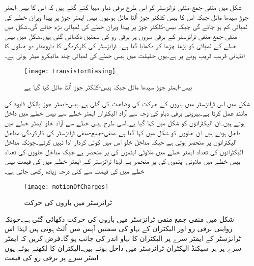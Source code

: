 	شکل   میں منفی-جمع-منفی  ٹرانزسٹر کو اس طرح برقی دباو مہیا کئے گئے ہیں کہ اس کا بیس-ایمٹر    جوڑ سیدھا مائل جبکہ اس کا بیس-کلکٹر   جوڑ اُلٹا مائل ہو۔یوں بیس-ایمٹر   جوڑ پر پیدا ویران  خطے  کی لمبائی کم ہو جائے گی جبکہ بیس-کلکٹر   جوڑ پر پیدا ویران  خطے کی لمبائی بڑھ جائے گی۔شکل میں منفی-جمع-منفی  ٹرانزسٹر کے برقی سروں پر برقی رو کی سمتیں دکھائی گئی ہیں۔شکل میں بیس خطے کے لمبائی کو بڑھا چڑھا کر دکھایا گیا ہے۔ ٹرانزسٹر کی کارکردگی کا دارومدار دو  خطوں کا انتہائی قریب قریب ہونے پر ہے۔یوں حقیقت میں بیس خطے کی لمبائی چند مائیکرو میٹر  ہوتی ہے۔
\begin{figure}
\centering
\texttt{[image: transistorBiasing]}
\caption{ بیس-ایمٹر  جوڑ  سیدھا مائل جبکہ بیس-کلکٹر جوڑ اُلٹا مائل کیا گیا ہے}
\label{شکل_ٹرانزسٹر_مائل_کرنا}
\end{figure}
	شکل   میں اس ٹرانزسٹر میں باروں کے حرکت کی وضاحت کی گئی ہے۔بیس-ایمٹر  جوڑ بالکل ڈایوڈ کی مانند عمل کرتا ہے۔بیرونی برقی دباو کی وجہ سے آزاد الیکٹران ایمٹر خطے سے بیس خطے میں داخل ہوتے ہیں۔ان الیکٹرانوں کو شکل میں  کہا گیا ہے۔اسی طرح بیس خطے سے آزاد خلو ایمٹر خطے میں داخل ہوتے ہیں۔ان خلووں کو شکل میں  کہا گیا ہے۔منفی-جمع-منفی ٹرانزسٹر کی کارکردگی مداخل الیکٹرانوں پر منحصر ہوتی ہے جبکہ مداخل خلو اس میں کوئی کردار ادا نہیں کرتے۔چونکہ مداخل الیکٹرانوں کی تعداد ایمٹر خطے میں ملاوٹی ایٹموں کی    پر منحصر ہے جبکہ مداخل خلووں کی تعداد بیس خطے میں ملاوٹی ایٹموں کی   پر منحصر ہے لہٰذا ٹرانزسٹر کے ایمٹر خطے میں   کی قیمت  بیس خطے میں  کی قیمت سے کئی درجہ زیادہ رکھی جاتی ہے۔
\begin{figure}
\centering
\texttt{[image: motionOfCharges]}
\caption{ ٹرانزسٹر میں باروں کی حرکت}
\label{شکل_ٹرانزسٹر_میں_چارجوں_کی_حرکت}
\end{figure}
	شکل  میں منفی-جمع-منفی  ٹرانزسٹر میں باروں کی حرکت دکھائی گئی ہے۔چونکہ روایتی برقی رو اور الیکٹران کے بہاو کی سمتیں آپس میں اُلٹ ہوتی ہیں لہٰذا اس ٹرانزسٹر کے ایمٹر سرے پر الیکٹران کا بہاو اندر کی جانب ہو گا۔فرض کریں کہ ایمٹر سرے پر ہر سیکنڈ  الیکٹران ٹرانزسٹر میں داخل ہوتے ہیں۔الیکٹران کا   لکھتے ہوئے یوں ایمٹر سرے پر برقی رو  کی قیمت
